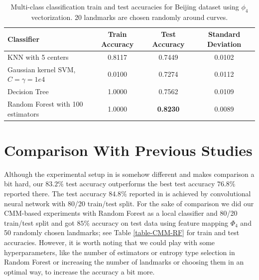 \documentclass[11pt]{myclass}
\begin{document}
\begin{table}[htbp]
\centering
\begin{tabular}{|l|c|c|c|}
\hline
          {\bf Classifier}  &   {\bf Train Accuracy} &  {\bf Test Accuracy} &  {\bf Standard Deviation}  \\
\hline 
	KNN with 5 centers &      0.8117 &        0.7449 &    0.0102  \\ 
	Gaussian kernel SVM, $C = \gamma = 1e4$ &   0.0100  &   0.7274 &  0.0112  \\
         Decision Tree &      1.0000 &        0.7562 &    0.0109  \\
         Random Forest with 100 estimators &      1.0000 &     {\bf 0.8230} &    0.0089  \\
\hline 
\end{tabular}
\caption{Multi-class classification train and test accuracies for Beijing dataset using $\phi_4$ vectorization. 20 landmarks are chosen randomly around curves.}
\label{table-multi-class}
\normalsize
\end{table}


\section{Comparison With Previous Studies}

Although the experimental setup in \cite{DCHR2020} is somehow different and makes comparison a bit hard, our $83.2\%$ test accuracy outperforms the best test accuracy $76.8\%$ reported there. The test accuracy $84.8\%$ reported in \cite{DH2018} is achieved by convolutional neural network with 80/20 train/test split. For the sake of comparison we did our CMM-based experiments with Random Forest as a local classifier and 80/20 train/test split and got $85\%$ accuracy on test data using feature mapping $\Phi_4$ and 50 randomly chosen landmarks; see Table \ref{table-CMM-RF} for train and test accuracies. However, it is worth noting that we could play with some hyperparameters, like the number of estimators or entropy type selection in Random Forest or increasing the number of landmarks or choosing them in an optimal way, to increase the accuracy a bit more. 
\end{document}

